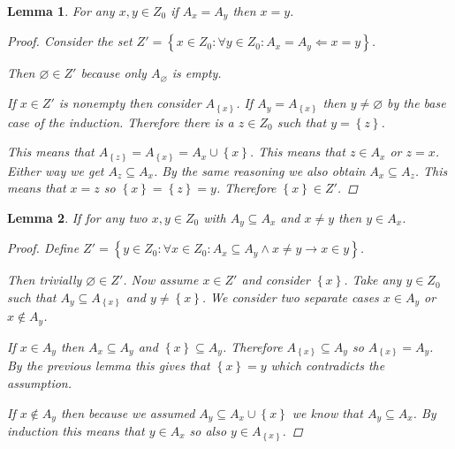 \documentclass{article}
\newtheorem*{lemma}{Lemma}
\theoremstyle{definition}
\newcommand{\set}[1]{\left\{#1\right\}}
\newcommand{\setwith}[2]{\set{#1\colon#2}}
\begin{document}
\begin{lemma}
    For any \(x,y\in Z_{0}\) if \(A_{x}=A_{y}\) then \(x=y\).

    \begin{proof}
        Consider the set \(Z'=\setwith{x\in Z_{0}}{\forall y\in
        Z_{0}:A_{x}=A_{y}\Leftarrow x=y}\).

        Then \(\varnothing\in Z'\) because only \(A_{\varnothing}\) is empty.

        If \(x\in Z'\) is nonempty then consider \(A_{\set{x}}\). If
        \(A_{y}=A_{\set{x}}\) then \(y\neq\varnothing\) by the base case of the
        induction. Therefore there is a \(z\in Z_{0}\) such that \(y=\set{z}\).

        This means that \(A_{\set{z}}=A_{\set{x}}=A_{x}\cup\set{x}\). This means
        that \(z\in A_{x}\) or \(z=x\). Either way we get \(A_{z}\subseteq
        A_{x}\). By the same reasoning we also obtain \(A_{x}\subseteq A_{z}\).
        This means that \(x=z\) so \(\set{x}=\set{z}=y\). Therefore \(\set{x}\in
        Z'\).
    \end{proof}
\end{lemma}

\begin{lemma}
    If for any two \(x,y\in Z_{0}\) with \(A_{y}\subseteq A_{x}\) and \(x\neq
    y\) then \(y\in A_{x}\).

    \begin{proof}
        Define \(Z'=\setwith{y\in Z_{0}}{\forall x\in Z_{0}:A_{x}\subseteq
        A_{y}\wedge x\neq y\to x\in y}\).

        Then trivially \(\varnothing\in Z'\). Now assume \(x\in Z'\) and
        consider \(\set{x}\). Take any \(y\in Z_{0}\) such that \(A_{y}\subseteq
        A_{\set{x}}\) and \(y\neq\set{x}\). We consider two separate cases
        \(x\in A_{y}\) or \(x\notin A_{y}\).

        If \(x\in A_{y}\) then \(A_{x}\subseteq A_{y}\) and \(\set{x}\subseteq
        A_{y}\). Therefore \(A_{\set{x}}\subseteq A_{y}\) so
        \(A_{\set{x}}=A_{y}\). By the previous lemma this gives that
        \(\set{x}=y\) which contradicts the assumption.

        If \(x\notin A_{y}\) then because we assumed \(A_{y}\subseteq
        A_{x}\cup\set{x}\) we know that \(A_{y}\subseteq A_{x}\). By induction
        this means that \(y\in A_{x}\) so also \(y\in A_{\set{x}}\).
    \end{proof}
\end{lemma}
\end{document}
